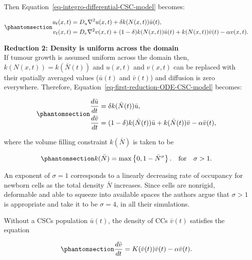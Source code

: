 \documentclass[
  letterpaper,
]{scrreprt}
\theoremstyle{definition}
\theoremstyle{remark}
\begin{document}
Then Equation~\ref{eq-integro-differential-CSC-model} becomes:

\begin{equation}\phantomsection\label{eq-first-reduction-ODE-CSC-model}{
\begin{aligned}
u_t(x,t) &= D_u \nabla^2 u(x,t) + \delta   k(N(x,t))\bar{u}(t), \\
v_t(x,t) &= D_v \nabla^2 v(x,t) + (1-\delta)   k(N(x,t))\bar{u}(t) + k(N(x,t))\bar{v}(t) - \alpha v(x,t).
\end{aligned}
}\end{equation}

\textbf{Reduction 2: Density is uniform across the domain}\\
If tumour growth is assumed uniform across the domain then,
\(k(N(x,t)) = k(\bar{N}(t))\) and \(u(x,t)\) and \(v(x,t)\) can be
replaced with their spatially averaged values (\(\bar{u}(t)\) and
\(\bar{v}(t)\)) and diffusion is zero everywhere. Therefore,
Equation~\ref{eq-first-reduction-ODE-CSC-model} becomes:

\begin{equation}\phantomsection\label{eq-ODE-CSC-model}{
\begin{aligned}
    \frac{d \bar{u}}{dt} &= \delta  k(\bar{N}(t)) \bar{u}, \\
    \frac{d \bar{v}}{dt} &= (1-\delta)  k(\bar{N}(t)) \bar{u} + k(\bar{N}(t)) \bar{v} - \alpha \bar{v}(t),
\end{aligned}
}\end{equation}

where the volume filling constraint \(k(\bar{N})\) is taken to be

\begin{equation}\phantomsection\label{eq-volume-filling-constraint}{
k(\bar{N}) = \text{max} \left\{0, 1 - \bar{N}^\sigma \right\}. \quad \text{for} \quad \sigma > 1.
}\end{equation}

An exponent of \(\sigma = 1\) corresponds to a linearly decreasing rate
of occupancy for newborn cells as the total density \(\bar{N}\)
increases. Since cells are nonrigid, deformable and able to squeeze into
available spaces the authors argue that \(\sigma > 1\) is appropriate
and take it to be \(\sigma = 4\), in all their simulations.

Without a CSCs population \(\bar{u}(t)\), the density of CCs
\(\bar{v}(t)\) satisfies the equation

\begin{equation}\phantomsection\label{eq-ODE-TC-only-model}{
\frac{d\bar{v}}{dt}  =K(\bar{v}(t))\bar{v}(t) - \alpha \bar{v}(t).
}\end{equation}
\end{document}
